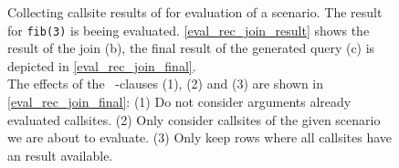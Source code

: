 \begin{figure}[h!]\footnotesize
    \centering
    \caption{Collecting callsite results of for evaluation of a scenario. The result for \texttt{fib(3)} is beeing evaluated. \autoref{eval_rec_join_result} shows the result of the join (b), the final result of the generated query (c) is depicted in \autoref{eval_rec_join_final}.\\
    The effects of the ~\WHERE-clauses (1), (2) and (3) are shown in \autoref{eval_rec_join_final}: (1) Do not consider arguments already evaluated callsites. (2) Only consider callsites of the given scenario we are about to evaluate. (3) Only keep rows where all callsites have an result available.}
    \label{macro:recursive_scenario_evaluation}
\end{figure}


